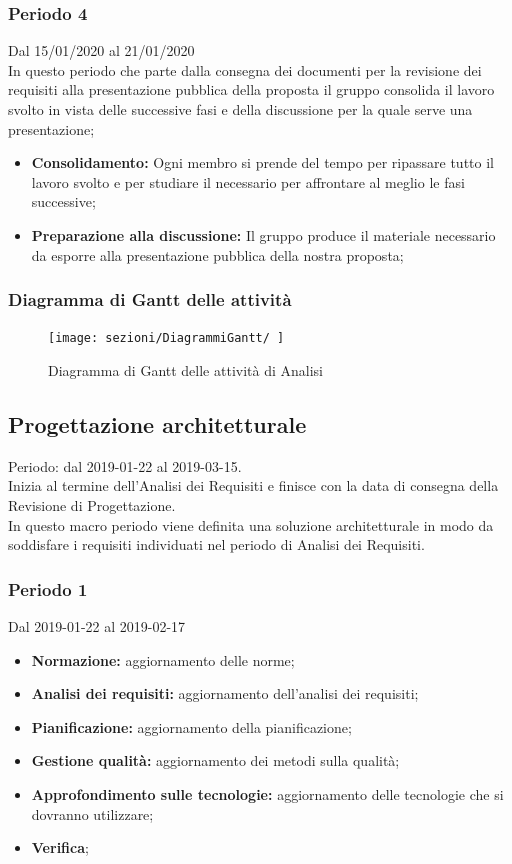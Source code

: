 \subsubsection{Periodo 4} 
Dal 15/01/2020 al 21/01/2020\\
In questo periodo che parte dalla consegna dei documenti per la revisione dei requisiti alla presentazione pubblica della proposta il gruppo consolida il lavoro svolto in vista delle successive fasi e della discussione per la quale serve una presentazione;
\begin{itemize}
	\item \textbf{Consolidamento:} Ogni membro si prende del tempo per ripassare tutto il lavoro svolto e per studiare il necessario per affrontare al meglio le fasi successive;
	\item \textbf{Preparazione alla discussione:} Il gruppo produce il materiale necessario da esporre alla presentazione pubblica della nostra proposta;
\end{itemize}
\subsubsection{Diagramma di Gantt delle attività}
\begin{figure}[h]
	\texttt{[image: sezioni/DiagrammiGantt/  ]}
	\caption{Diagramma di Gantt delle attività di Analisi}
\end{figure}


\subsection{Progettazione architetturale}
Periodo: dal 2019-01-22 al 2019-03-15.
\\Inizia al termine dell'Analisi dei Requisiti e finisce con la data di consegna della Revisione di Progettazione.
\\In questo macro periodo viene definita una soluzione architetturale in modo da soddisfare i requisiti individuati nel periodo di Analisi dei Requisiti.

\subsubsection{Periodo 1} 
Dal 2019-01-22 al 2019-02-17
\begin{itemize}
	\item \textbf{Normazione:} aggiornamento delle norme;
	\item \textbf{Analisi dei requisiti:} aggiornamento dell'analisi dei requisiti;
	\item \textbf{Pianificazione:} aggiornamento della pianificazione;
	\item \textbf{Gestione qualità:} aggiornamento dei metodi sulla qualità;
	\item \textbf{Approfondimento sulle tecnologie:} aggiornamento delle tecnologie che si dovranno utilizzare;
	\item \textbf{Verifica};
\end{itemize}
